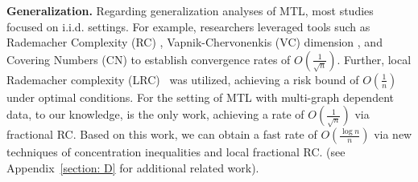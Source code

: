 \documentclass{article}
\begin{document}
\textbf{Generalization.} Regarding generalization analyses of MTL, most studies focused on i.i.d. settings. For example, researchers leveraged tools such as Rademacher Complexity (RC) \cite{maurer06rade,maurer06linear,kakade12}, Vapnik-Chervonenkis (VC) dimension \cite{vcoriginal00}, and Covering Numbers (CN) \cite{baxter00,maurer2016benefit} to establish convergence rates of $O(\frac{1}{\sqrt{n}})$. Further, local Rademacher complexity (LRC)~\cite{yousefi18,watkins2023optimistic} was utilized, achieving a risk bound of $O(\frac{1}{n})$ under optimal conditions. For the setting of MTL with multi-graph dependent data, to our knowledge, \cite{wu2023macro-auc} is the only work, achieving a rate of $O(\frac{1}{\sqrt{n}})$ via fractional RC. Based on this work, we can obtain a fast rate of  $O(\frac{\log n}{n})$ via new techniques of concentration inequalities and local fractional RC. (see Appendix~\ref{section: D} for additional related work). 
\end{document}
